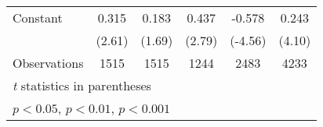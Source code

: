 \begin{table}[htbp]
\begin{tabular}{l*{5}{c}}
\addlinespace
Constant                                &    0.315\sym{*}  &    0.183         &    0.437\sym{**} &   -0.578\sym{***}&    0.243\sym{***}\\
                                        &   (2.61)         &   (1.69)         &   (2.79)         &  (-4.56)         &   (4.10)         \\
\midrule
Observations                            &     1515         &     1515         &     1244         &     2483         &     4233         \\
\bottomrule
\multicolumn{6}{l}{\footnotesize \textit{t} statistics in parentheses}\\
\multicolumn{6}{l}{\footnotesize \sym{*} \(p<0.05\), \sym{**} \(p<0.01\), \sym{***} \(p<0.001\)}\\
\end{tabular}
\end{table}
